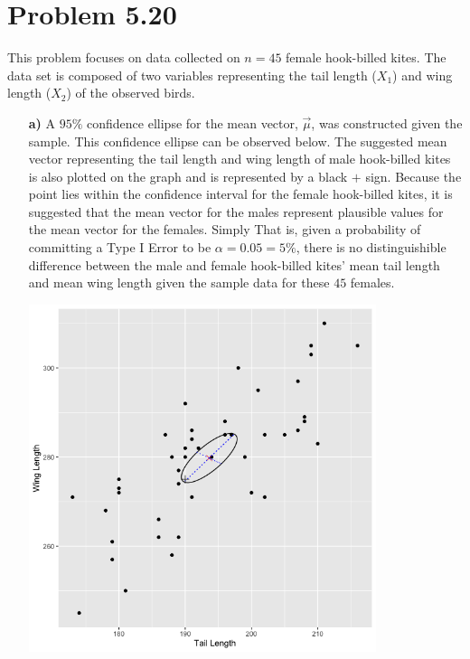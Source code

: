 \newpage
\section*{Problem 5.20}
This problem focuses on data collected on $n = 45$ female hook-billed kites. The data set is composed of two variables representing the tail length ($X_1$) and wing length ($X_2$) of the observed birds.

\begin{enumerate}
\item[\bf{a)}] A $95\%$ confidence ellipse for the mean vector, $\vec{\mu}$, was constructed given the sample. This confidence ellipse can be observed below. The suggested mean vector representing the tail length and wing length of male hook-billed kites is also plotted on the graph and is represented by a black $+$ sign. Because the point lies within the confidence interval for the female hook-billed kites, it is suggested that the mean vector for the males represent plausible values for the mean vector for the females. Simply That is, given a probability of committing a Type I Error to be $\alpha = 0.05 = 5\%$, there is no distinguishible difference between the male and female hook-billed kites' mean tail length and mean wing length given the sample data for these $45$ females.
	
	\begin{center}
		\includegraphics[width=4in]{plot_5_20_a_ellipse.png}
	\end{center}
	

\end{enumerate}
